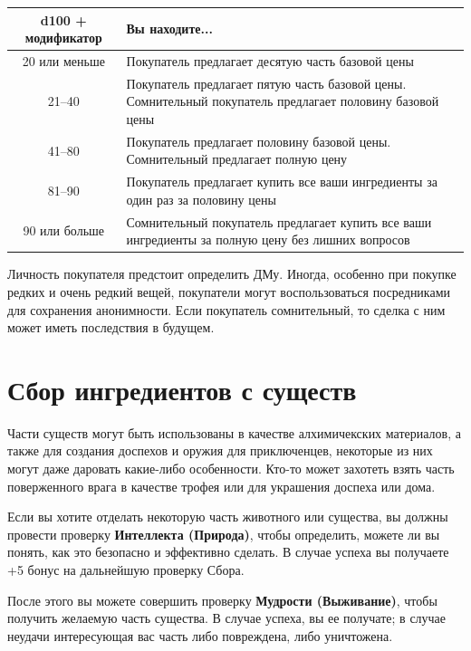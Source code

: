 \documentclass[a4paper, 9pt, twocolumn]{book}
\begin{document}
	\begin{center}
		
		\begin{tabular}{|c|l|}
			\hline
			\textbf{d100 + модификатор} & \textbf{Вы находите...} \\
			\hline
			20 или меньше & Покупатель предлагает десятую часть базовой цены \\
			\hline
			21--40 & Покупатель предлагает пятую часть базовой цены. Сомнительный покупатель предлагает половину базовой цены \\
			\hline
			41--80 & Покупатель предлагает половину базовой цены. Сомнительный предлагает полную цену \\
			\hline
			81--90 & Покупатель предлагает купить все ваши ингредиенты за один раз за половину цены \\
			\hline
			90 или больше & Сомнительный покупатель предлагает купить все ваши ингредиенты за полную цену без лишних вопросов \\
			\hline
		\end{tabular}
	\end{center}

	Личность покупателя предстоит определить ДМу. Иногда, особенно при покупке редких и очень редкий вещей, покупатели могут воспользоваться посредниками для сохранения анонимности. Если покупатель сомнительный, то сделка с ним может иметь последствия в будущем.
	
	\section{Сбор ингредиентов с существ}
	
	Части существ могут быть использованы в качестве алхимичекских материалов, а также для создания доспехов и оружия для приключенцев, некоторые из них могут даже даровать какие-либо особенности. Кто-то может захотеть взять часть поверженного врага в качестве трофея или для украшения доспеха или дома.
	
	Если вы хотите отделать некоторую часть животного или существа, вы должны провести проверку \textbf{Интеллекта (Природа)}, чтобы определить, можете ли вы понять, как это безопасно и эффективно сделать. В случае успеха вы получаете +5 бонус на дальнейшую проверку Сбора.
	
	После этого вы можете совершить проверку \textbf{Мудрости (Выживание)}, чтобы получить желаемую часть существа. В случае успеха, вы ее получате; в случае неудачи интересующая вас часть либо повреждена, либо уничтожена.
	
\end{document}
